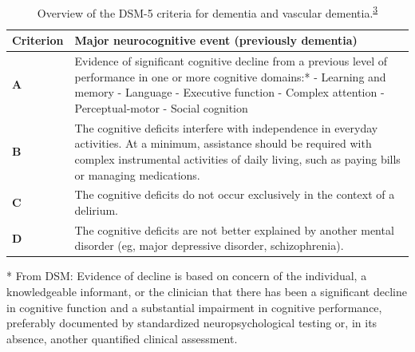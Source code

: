 \documentclass[a4paper, twoside]{templates/ociamthesis}
\begin{document}
\begin{table}[H]

\caption[Overview of the DSM-5 criteria for dementia and vascular dementia.]{\label{tab:diagnosticCriteria-table}Overview of the DSM-5 criteria for dementia and vascular dementia.\textsuperscript{\protect\hyperlink{ref-edition2013}{3}}}
\centering
\begin{threeparttable}
\begin{tabular}[t]{>{\centering\arraybackslash}p{5em}>{\raggedright\arraybackslash}p{27em}}
\toprule
\textbf{Criterion} & \textbf{Major neurocognitive event (previously dementia)}\\
\midrule
\textbf{A} & Evidence of significant cognitive decline from a previous level of performance in one or more cognitive domains:* \newline - Learning and memory \newline - Language \newline - Executive function \newline - Complex attention \newline - Perceptual-motor \newline - Social cognition \newline\\
\midrule
\textbf{B} & The cognitive deficits interfere with independence in everyday activities. At a minimum, assistance should be required with complex instrumental activities of daily living, such as paying bills or managing medications. \newline\\
\midrule
\textbf{C} & The cognitive deficits do not occur exclusively in the context of a delirium. \newline\\
\midrule
\textbf{D} & The cognitive deficits are not better explained by another mental disorder (eg, major depressive disorder, schizophrenia). \newline\\
\bottomrule
\end{tabular}
\begin{tablenotes}
\item[*] From DSM: Evidence of decline is based on concern of the individual, a knowledgeable informant, or the clinician that there has been a significant decline in cognitive function and a substantial impairment in cognitive performance, preferably documented by standardized neuropsychological testing or, in its absence, another quantified clinical assessment.
\end{tablenotes}
\end{threeparttable}
\end{table}
\end{document}
